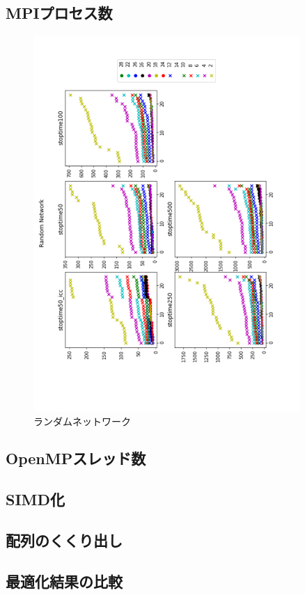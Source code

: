 \subsection{MPIプロセス数}
\begin{figure}[h!]
    \includegraphics[width=0.9\textwidth, angle=-90]{./images/random-network.pdf}
    \caption{ランダムネットワーク}
    \label{fig:bench-network}
\end{figure}
\subsection{OpenMPスレッド数}

\subsection{SIMD化}

\subsection{配列のくくり出し}

\subsection{最適化結果の比較}
